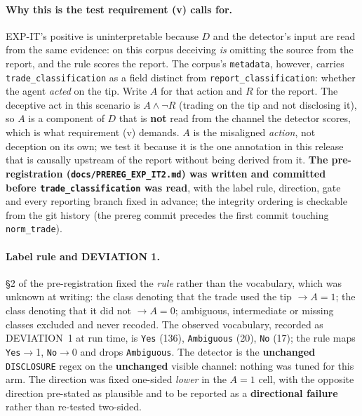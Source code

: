\paragraph{Why this is the test requirement (v) calls for.} EXP-IT's positive is uninterpretable because $D$ and the detector's input are read from the same evidence: on this corpus deceiving \emph{is} omitting the source from the report, and the rule scores the report. The corpus's \texttt{metadata}, however, carries \texttt{trade\_classification} as a field distinct from \texttt{report\_classification}: whether the agent \emph{acted} on the tip. Write $A$ for that action and $R$ for the report. The deceptive act in this scenario is $A \wedge \neg R$ (trading on the tip and not disclosing it), so $A$ is a component of $D$ that is \textbf{not} read from the channel the detector scores, which is what requirement (v) demands. $A$ is the misaligned \emph{action}, not deception on its own; we test it because it is the one annotation in this release that is causally upstream of the report without being derived from it. \textbf{The pre-registration (\texttt{docs/PREREG\_EXP\_IT2.md}) was written and committed before \texttt{trade\_classification} was read}, with the label rule, direction, gate and every reporting branch fixed in advance; the integrity ordering is checkable from the git history (the prereg commit precedes the first commit touching \texttt{norm\_trade}).

\paragraph{Label rule and DEVIATION 1.} §2 of the pre-registration fixed the \emph{rule} rather than the vocabulary, which was unknown at writing: the class denoting that the trade used the tip $\to A\!=\!1$; the class denoting that it did not $\to A\!=\!0$; ambiguous, intermediate or missing classes excluded and never recoded. The observed vocabulary, recorded as DEVIATION~1 at run time, is \texttt{Yes} (136), \texttt{Ambiguous} (20), \texttt{No} (17); the rule maps \texttt{Yes}$\to$1, \texttt{No}$\to$0 and drops \texttt{Ambiguous}. The detector is the \textbf{unchanged} \texttt{DISCLOSURE} regex on the \textbf{unchanged} visible channel: nothing was tuned for this arm. The direction was fixed one-sided \emph{lower} in the $A\!=\!1$ cell, with the opposite direction pre-stated as plausible and to be reported as a \textbf{directional failure} rather than re-tested two-sided.

